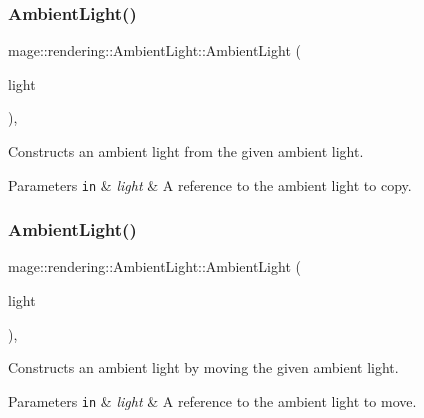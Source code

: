 \subsubsection{\texorpdfstring{Ambient\+Light()}{AmbientLight()}\hspace{0.1cm}{\footnotesize\ttfamily [2/3]}}
{\footnotesize\ttfamily mage\+::rendering\+::\+Ambient\+Light\+::\+Ambient\+Light (\begin{DoxyParamCaption}\item[{const \mbox{\hyperlink{classmage_1_1rendering_1_1_ambient_light}{Ambient\+Light}} \&}]{light }\end{DoxyParamCaption})\hspace{0.3cm}{\ttfamily [default]}, {\ttfamily [noexcept]}}

Constructs an ambient light from the given ambient light.


\begin{DoxyParams}[1]{Parameters}
\mbox{\tt in}  & {\em light} & A reference to the ambient light to copy. \\
\hline
\end{DoxyParams}
\mbox{\label{classmage_1_1rendering_1_1_ambient_light_a8bd09baed470ce2c09af6a9893549937}} 
\subsubsection{\texorpdfstring{Ambient\+Light()}{AmbientLight()}\hspace{0.1cm}{\footnotesize\ttfamily [3/3]}}
{\footnotesize\ttfamily mage\+::rendering\+::\+Ambient\+Light\+::\+Ambient\+Light (\begin{DoxyParamCaption}\item[{\mbox{\hyperlink{classmage_1_1rendering_1_1_ambient_light}{Ambient\+Light}} \&\&}]{light }\end{DoxyParamCaption})\hspace{0.3cm}{\ttfamily [default]}, {\ttfamily [noexcept]}}

Constructs an ambient light by moving the given ambient light.


\begin{DoxyParams}[1]{Parameters}
\mbox{\tt in}  & {\em light} & A reference to the ambient light to move. \\
\hline
\end{DoxyParams}
\mbox{\label{classmage_1_1rendering_1_1_ambient_light_a811cb86e80188b924085674a88a0bf7b}} 
